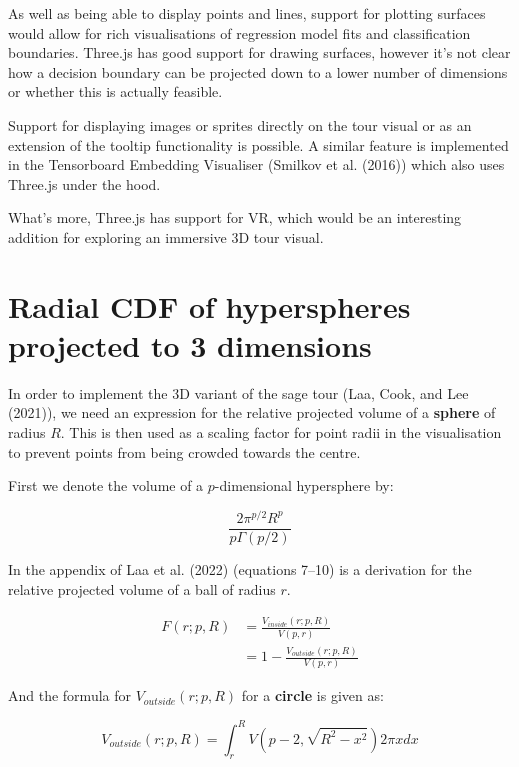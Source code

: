 As well as being able to display points and lines, support for plotting surfaces would allow for rich visualisations of regression model fits and classification boundaries. Three.js has good support for drawing surfaces, however it's not clear how a decision boundary can be projected down to a lower number of dimensions or whether this is actually feasible.

Support for displaying images or sprites directly on the tour visual or as an extension of the tooltip functionality is possible. A similar feature is implemented in the Tensorboard Embedding Visualiser (Smilkov et al. (2016)) which also uses Three.js under the hood.

What's more, Three.js has support for VR, which would be an interesting addition for exploring an immersive 3D tour visual.

\pagebreak

\hypertarget{radial-cdf-of-hyperspheres-projected-to-3-dimensions}{%
\section{Radial CDF of hyperspheres projected to 3 dimensions}\label{radial-cdf-of-hyperspheres-projected-to-3-dimensions}}

In order to implement the 3D variant of the sage tour (Laa, Cook, and Lee (2021)), we need an expression for the relative projected volume of a \textbf{sphere} of radius \(R\). This is then used as a scaling factor for point radii in the visualisation to prevent points from being crowded towards the centre.

First we denote the volume of a \(p\)-dimensional hypersphere by:

\[
\frac{2\pi^{p/2}R^p}{p\Gamma(p/2)}
\]

In the appendix of Laa et al. (2022) (equations 7--10) is a derivation for the relative projected volume of a ball of radius \(r\).

\begin{align}
    F(r; p, R) &= \frac{V_{inside}(r; p, R)}{ V(p, r) } \\
    &= 1 - \frac{V_{outside}(r; p, R)}{ V(p, r) }
    \label{eq:F2}
\end{align}

And the formula for \(V_{outside}(r; p, R)\) for a \textbf{circle} is given as:

\begin{equation}
V_{outside}(r; p, R) =
\int_r^R V(p-2, \sqrt{R^2 - x^2})2\pi x dx 
\label{eq:v-outside}
\end{equation}

